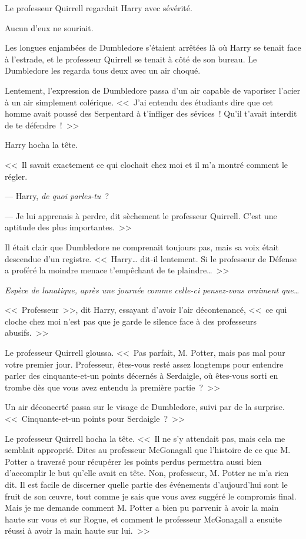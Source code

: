 Le professeur Quirrell regardait Harry avec sévérité.

Aucun d'eux ne souriait.

Les longues enjambées de Dumbledore s'étaient arrêtées là où Harry se tenait face à l'estrade, et le professeur Quirrell se tenait à côté de son bureau. Le Dumbledore les regarda tous deux avec un air choqué.

Lentement, l'expression de Dumbledore passa d'un air capable de vaporiser l'acier à un air simplement colérique. <<~J'ai entendu des étudiants dire que cet homme avait poussé des Serpentard à t'infliger des sévices~! Qu'il t'avait interdit de te défendre~!~>>

Harry hocha la tête.

<<~Il savait exactement ce qui clochait chez moi et il m'a montré comment le régler.

--- Harry, \emph{de quoi parles-tu}~?

--- Je lui apprenais à perdre, dit sèchement le professeur Quirrell. C'est une aptitude des plus importantes.~>>

Il était clair que Dumbledore ne comprenait toujours pas, mais sa voix était descendue d'un registre. <<~Harry… dit-il lentement. Si le professeur de Défense a proféré la moindre menace t'empêchant de te plaindre…~>>

\emph{Espèce de lunatique, après une journée comme celle-ci pensez-vous vraiment que…}

<<~Professeur~>>, dit Harry, essayant d'avoir l'air décontenancé, <<~ce qui cloche chez moi n'est pas que je garde le silence face à des professeurs abusifs.~>>

Le professeur Quirrell gloussa. <<~Pas parfait, M. Potter, mais pas mal pour votre premier jour. Professeur, êtes-vous resté assez longtemps pour entendre parler des cinquante-et-un points décernés à Serdaigle, où êtes-vous sorti en trombe dès que vous avez entendu la première partie~?~>>

Un air déconcerté passa sur le visage de Dumbledore, suivi par de la surprise. <<~Cinquante-et-un points pour Serdaigle~?~>>

Le professeur Quirrell hocha la tête. <<~Il ne s'y attendait pas, mais cela me semblait approprié. Dites au professeur McGonagall que l'histoire de ce que M. Potter a traversé pour récupérer les points perdus permettra aussi bien d'accomplir le but qu'elle avait en tête. Non, professeur, M. Potter ne m'a rien dit. Il est facile de discerner quelle partie des événements d'aujourd'hui sont le fruit de son œuvre, tout comme je sais que vous avez suggéré le compromis final. Mais je me demande comment M. Potter a bien pu parvenir à avoir la main haute sur vous et sur Rogue, et comment le professeur McGonagall a ensuite réussi à avoir la main haute sur lui.~>>

